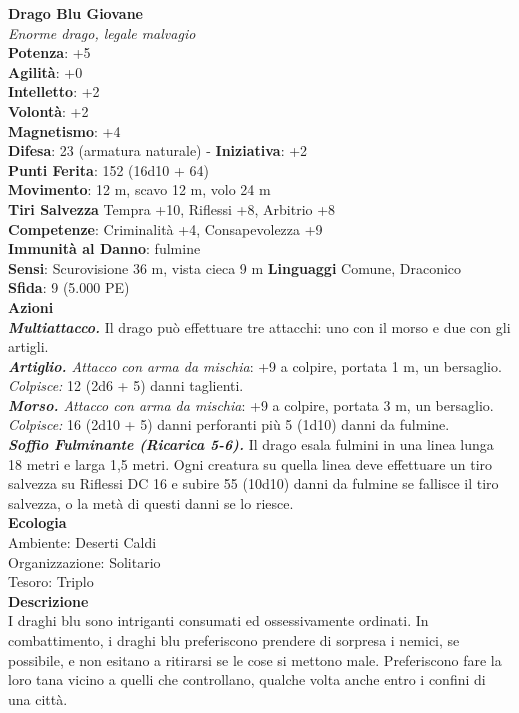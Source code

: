 \begin{multicols}{2}
\medskip\textbf{Drago Blu Giovane}\\
\emph{Enorme drago, legale malvagio}\\
\textbf{Potenza}: +5\\
\textbf{Agilità}: +0\\
\textbf{Intelletto}: +2\\
\textbf{Volontà}: +2\\
\textbf{Magnetismo}: +4\\
\textbf{Difesa}: 23 (armatura naturale) - \textbf{Iniziativa}: +2\\
\textbf{Punti Ferita}: 152 (16d10 + 64)\\
\textbf{Movimento}: 12 m, scavo 12 m, volo 24 m\\
\textbf{Tiri Salvezza} Tempra +10, Riflessi +8, Arbitrio +8\\
\textbf{Competenze}: Criminalità +4, Consapevolezza +9\\
\textbf{Immunità al Danno}: fulmine\\
\textbf{Sensi}: Scurovisione 36 m, vista cieca 9 m
\textbf{Linguaggi} Comune, Draconico\\
\textbf{Sfida}: 9 (5.000 PE)\smallskip\\
\smallskip\textbf{Azioni}\\
\emph{\textbf{Multiattacco.}} Il drago può effettuare tre attacchi: uno con il morso e due con gli artigli.\\
\emph{\textbf{Artiglio.} Attacco con arma da mischia}: +9 a colpire, portata 1 m, un bersaglio.\\
\emph{Colpisce:} 12 (2d6 + 5) danni taglienti.\\
\emph{\textbf{Morso.} Attacco con arma da mischia}: +9 a colpire, portata 3 m, un bersaglio.\\
\emph{Colpisce:} 16 (2d10 + 5) danni perforanti più 5 (1d10) danni da fulmine.\\
\emph{\textbf{Soffio Fulminante (Ricarica 5-6).}} Il drago esala fulmini in una linea lunga 18 metri e larga 1,5 metri. Ogni creatura su quella linea deve effettuare un tiro salvezza su Riflessi DC 16 e subire 55 (10d10) danni da fulmine se fallisce il tiro salvezza, o la metà di questi danni se lo riesce.\\
\textbf{Ecologia}\\
Ambiente: Deserti Caldi\\
Organizzazione: Solitario\\
Tesoro: Triplo\\
\textbf{Descrizione}\\
I draghi blu sono intriganti consumati ed ossessivamente ordinati. In combattimento, i draghi blu preferiscono prendere di sorpresa i nemici, se possibile, e non esitano a ritirarsi se le cose si mettono male. Preferiscono fare la loro tana vicino a quelli che controllano, qualche volta anche entro i confini di una città.\\



\end{multicols}
